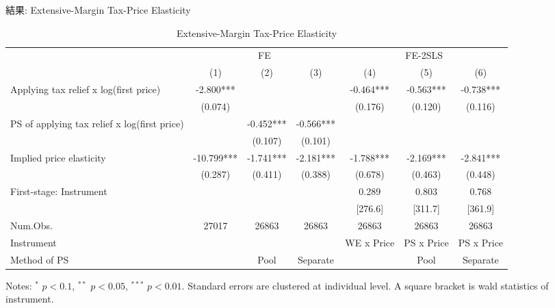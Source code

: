 \documentclass[
  ignorenonframetext,
  aspectratio=169,
]{beamer}
\begin{document}
\begin{frame}{結果: Extensive-Margin Tax-Price Elasticity}
\protect\hypertarget{ux7d50ux679c-extensive-margin-tax-price-elasticity}{}
\begin{table}

\caption{\label{tab:MainExtensive}Extensive-Margin Tax-Price Elasticity}
\centering
\fontsize{7}{9}\selectfont
\begin{threeparttable}
\begin{tabular}[t]{lcccccc}
\toprule
\multicolumn{1}{c}{ } & \multicolumn{3}{c}{FE} & \multicolumn{3}{c}{FE-2SLS} \\
\cmidrule(l{3pt}r{3pt}){2-4} \cmidrule(l{3pt}r{3pt}){5-7}
  & (1) & (2) & (3) & (4) & (5) & (6)\\
\midrule
Applying tax relief x log(first price) & -2.800*** &  &  & -0.464*** & -0.563*** & -0.738***\\
 & (0.074) &  &  & (0.176) & (0.120) & (0.116)\\
PS of applying tax relief x log(first price) &  & -0.452*** & -0.566*** &  &  & \\
 &  & (0.107) & (0.101) &  &  & \\
\midrule
Implied price elasticity & -10.799*** & -1.741*** & -2.181*** & -1.788*** & -2.169*** & -2.841***\\
 & (0.287) & (0.411) & (0.388) & (0.678) & (0.463) & (0.448)\\
First-stage: Instrument &  &  &  & 0.289 & 0.803 & 0.768\\
 &  &  &  & [276.6] & [311.7] & [361.9]\\
Num.Obs. & 27017 & 26863 & 26863 & 26863 & 26863 & 26863\\
Instrument &  &  &  & WE x Price & PS x Price & PS x Price\\
Method of PS &  & Pool & Separate &  & Pool & Separate\\
\bottomrule
\end{tabular}
\begin{tablenotes}
\item Notes: $^{*}$ $p < 0.1$, $^{**}$ $p < 0.05$, $^{***}$ $p < 0.01$. Standard errors are clustered at individual level. A square bracket is wald statistics of instrument.
\end{tablenotes}
\end{threeparttable}
\end{table}
\end{frame}
\end{document}
